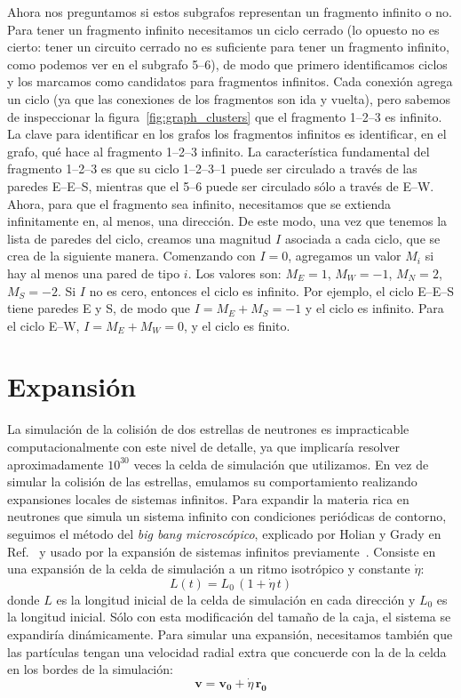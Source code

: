 Ahora nos preguntamos si estos subgrafos representan un fragmento infinito o no.
Para tener un fragmento infinito necesitamos un ciclo cerrado (lo opuesto no es cierto: tener un circuito cerrado no es suficiente para tener un fragmento infinito, como podemos ver en el subgrafo 5--6), de modo que primero identificamos ciclos y los marcamos como candidatos para fragmentos infinitos.
Cada conexión agrega un ciclo (ya que las conexiones de los fragmentos son ida y vuelta), pero sabemos de inspeccionar la figura~\ref{fig:graph_clusters} que el fragmento 1--2--3 es infinito.
La clave para identificar en los grafos los fragmentos infinitos es identificar, en el grafo, qué hace al fragmento 1--2--3 infinito.
La característica fundamental del fragmento 1--2--3 es que su ciclo 1--2--3--1 puede ser circulado a través de las paredes E--E--S, mientras que el 5--6 puede ser circulado sólo a través de E--W.
Ahora, para que el fragmento sea infinito, necesitamos que se extienda infinitamente en, al menos, una dirección.
De este modo, una vez que tenemos la lista de paredes del ciclo, creamos una magnitud $I$ asociada a cada ciclo, que se crea de la siguiente manera.
Comenzando con $I=0$, agregamos un valor $M_i$ si hay al menos una pared de tipo $i$.
Los valores son: $M_E= 1$, $M_W = -1$, $M_N = 2$, $M_S = -2$.
Si $I$ no es cero, entonces el ciclo es infinito.
Por ejemplo, el ciclo  E--E--S tiene paredes E y S, de modo que $I = M_E + M_S = -1$ y el ciclo es infinito.
Para el ciclo E--W, $I = M_E + M_W = 0$, y el ciclo es finito.

\section{Expansión}\label{sc:expansion}
La simulación de la colisión de dos estrellas de neutrones es impracticable computacionalmente con este nivel de detalle, ya que implicaría resolver aproximadamente $10^{30}$ veces la celda de simulación que utilizamos.
En vez de simular la colisión de las estrellas, emulamos su comportamiento realizando expansiones locales de sistemas infinitos.
Para expandir la materia rica en neutrones que simula un sistema infinito con condiciones periódicas de contorno, seguimos el método del \emph{big bang microscópico}, explicado por Holian y Grady en Ref.~\cite{holian_fragmentation_1988} y usado por la expansión de sistemas infinitos previamente~\cite{dorso_onset_1996}.
Consiste en una expansión de la celda de simulación a un ritmo isotrópico y constante $\dot{\eta}$:
\begin{equation}
  L(t) = L_0\,(1+\dot{\eta}\,t)
\end{equation}
donde $L$ es la longitud inicial de la celda de simulación en cada dirección y $L_0$ es la longitud inicial.
Sólo con esta modificación del tamaño de la caja, el sistema se expandiría dinámicamente.
Para simular una expansión, necesitamos también que las partículas tengan una velocidad radial extra que concuerde con la de la celda en los bordes de la simulación:
\begin{equation}
  \mathbf{v} = \mathbf{v_0} + \dot{\eta}\,\mathbf{r_0}
\end{equation}

